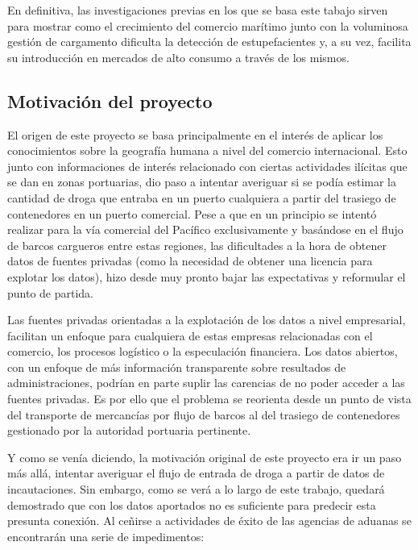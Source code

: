 \documentclass[12pt]{article}
\begin{document}
	En definitiva, las investigaciones previas en los que se basa este tabajo sirven para mostrar como el crecimiento del comercio marítimo junto con la voluminosa gestión de cargamento dificulta la detección de estupefacientes y, a su vez, facilita su introducción en mercados de alto consumo a través de los mismos.
	
	\subsection{\label{motivacion}Motivación del proyecto}
	El origen de este proyecto se basa principalmente en el interés de aplicar los conocimientos sobre la geografía humana a nivel del comercio internacional. Esto junto con informaciones de interés relacionado con ciertas actividades ilícitas que se dan en zonas portuarias, dio paso a intentar averiguar si se podía estimar la cantidad de droga que entraba en un puerto cualquiera a partir del trasiego de contenedores en un puerto comercial. Pese a que en un principio se intentó realizar para la vía comercial del Pacífico exclusivamente y basándose en el flujo de barcos cargueros entre estas regiones, las dificultades a la hora de obtener datos de fuentes privadas (como la necesidad de obtener una licencia para explotar los datos), hizo desde muy pronto bajar las expectativas y reformular el punto de partida.
	
	Las fuentes privadas orientadas a la explotación de los datos a nivel empresarial, facilitan un enfoque para cualquiera de estas empresas relacionadas con el comercio, los procesos logístico o la especulación financiera. Los datos abiertos, con un enfoque de más información transparente sobre resultados de administraciones, podrían en parte suplir las carencias de no poder acceder a las fuentes privadas. Es por ello que el problema se reorienta desde un punto de vista del transporte de mercancías por flujo de barcos al del trasiego de contenedores gestionado por la autoridad portuaria pertinente.
	
	Y como se venía diciendo, la motivación original de este proyecto era ir un paso más allá, intentar averiguar el flujo de entrada de droga a partir de datos de incautaciones. Sin embargo, como se verá a lo largo de este trabajo, quedará demostrado que con los datos aportados no es suficiente para predecir esta presunta conexión. Al ceñirse a actividades de éxito de las agencias de aduanas se encontrarán una serie de impedimentos:
	
\end{document}
